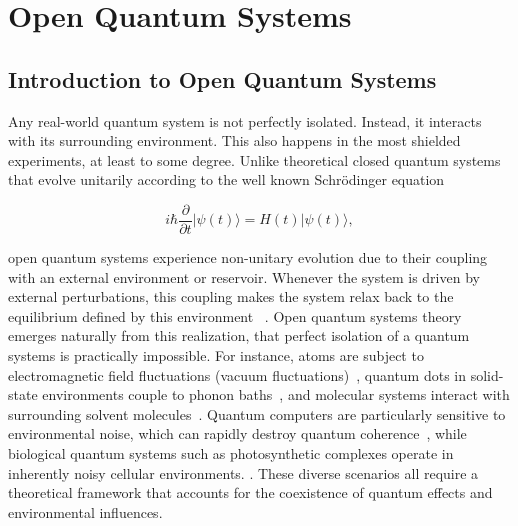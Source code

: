\chapter{Open Quantum Systems} %
\label{chapter_open_quantum_systems} %


\section{Introduction to Open Quantum Systems}
\label{sec:introduction_open_quantum_systems}

Any real-world quantum system is not perfectly isolated. Instead, it interacts with its surrounding environment. This also happens in the most shielded experiments, at least to some degree. Unlike theoretical closed quantum systems that evolve unitarily according to the well known Schrödinger equation 

\begin{equation}
	i\hbar \frac{\partial}{\partial t} |\psi(t)\rangle = H(t) |\psi(t)\rangle ,
	\label{eq:SchrödingerEquation}
\end{equation}

\noindent
open quantum systems experience non-unitary evolution due to their coupling with an external environment or reservoir.
Whenever the system is driven by external perturbations, this coupling makes the system relax back to the equilibrium defined by this environment ~\cite{breuerpetruccione2009theoryopenquantum, weiss2012quantumdissipativesystems}.
Open quantum systems theory emerges naturally from this realization, that perfect isolation of a quantum systems is practically impossible. For instance, atoms are subject to electromagnetic field fluctuations (vacuum fluctuations)~\cite{breuerpetruccione2009theoryopenquantum}, quantum dots in solid-state environments couple to phonon baths~\cite{weiss2012quantumdissipativesystems}, and molecular systems interact with surrounding solvent molecules~\cite{mukamel1995principlesnonlinearoptical}. Quantum computers are particularly sensitive to environmental noise, which can rapidly destroy quantum coherence~\cite{laddetal2010quantumcomputers}, while biological quantum systems such as photosynthetic complexes operate in inherently noisy cellular environments. . 
These diverse scenarios all require a theoretical framework that accounts for the coexistence of quantum effects and environmental influences.

